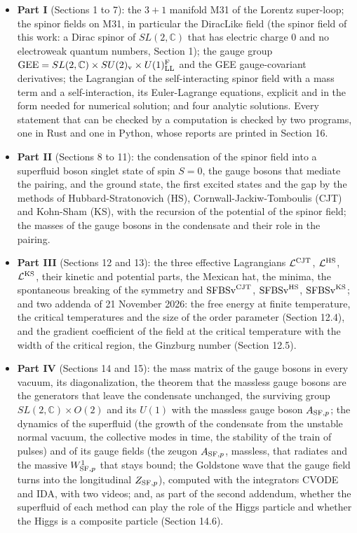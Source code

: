 \documentclass[
  10pt,
]{article}
\providecommand{\tightlist}{%
  \setlength{\itemsep}{0pt}\setlength{\parskip}{0pt}}
\begin{document}
\begin{itemize}
\tightlist
\item
  \textbf{Part I} (Sections 1 to 7): the \(3+1\) manifold M31 of the
  Lorentz super-loop; the spinor fields on M31, in particular the
  DiracLike field (the spinor field of this work: a Dirac spinor of
  \(SL(2,\mathbb C)\) that has electric charge 0 and no electroweak
  quantum numbers, Section 1); the gauge group
  \(\mathrm{GEE}=SL(2,\mathbb C)\times SU(2)_{\rm v}\times U(1)^{\rm F}_{\rm LL}\)
  and the GEE gauge-covariant derivatives; the Lagrangian of the
  self-interacting spinor field with a mass term and a self-interaction,
  its Euler-Lagrange equations, explicit and in the form needed for
  numerical solution; and four analytic solutions. Every statement that
  can be checked by a computation is checked by two programs, one in
  Rust and one in Python, whose reports are printed in Section 16.
\item
  \textbf{Part II} (Sections 8 to 11): the condensation of the spinor
  field into a superfluid boson singlet state of spin \(S=0\), the gauge
  bosons that mediate the pairing, and the ground state, the first
  excited states and the gap by the methods of Hubbard-Stratonovich
  (HS), Cornwall-Jackiw-Tomboulis (CJT) and Kohn-Sham (KS), with the
  recursion of the potential of the spinor field; the masses of the
  gauge bosons in the condensate and their role in the pairing.
\item
  \textbf{Part III} (Sections 12 and 13): the three effective
  Lagrangians \(\mathcal L^{\rm CJT}\), \(\mathcal L^{\rm HS}\),
  \(\mathcal L^{\rm KS}\), their kinetic and potential parts, the
  Mexican hat, the minima, the spontaneous breaking of the symmetry and
  \(\mathrm{SFBSv}^{\rm CJT}\), \(\mathrm{SFBSv}^{\rm HS}\),
  \(\mathrm{SFBSv}^{\rm KS}\); and two addenda of 21 November 2026: the
  free energy at finite temperature, the critical temperatures and the
  size of the order parameter (Section 12.4), and the gradient
  coefficient of the field at the critical temperature with the width of
  the critical region, the Ginzburg number (Section 12.5).
\item
  \textbf{Part IV} (Sections 14 and 15): the mass matrix of the gauge
  bosons in every vacuum, its diagonalization, the theorem that the
  massless gauge bosons are the generators that leave the condensate
  unchanged, the surviving group \(SL(2,\mathbb C)\times O(2)\) and its
  \(U(1)\) with the massless gauge boson \(A_{{\rm SF},p}\); the
  dynamics of the superfluid (the growth of the condensate from the
  unstable normal vacuum, the collective modes in time, the stability of
  the train of pulses) and of its gauge fields (the zeugon
  \(A_{{\rm SF},p}\), massless, that radiates and the massive
  \(W^1_{{\rm SF},p}\) that stays bound; the Goldstone wave that the
  gauge field turns into the longitudinal \(Z_{{\rm SF},p}\)), computed
  with the integrators CVODE and IDA, with two videos; and, as part of
  the second addendum, whether the superfluid of each method can play
  the role of the Higgs particle and whether the Higgs is a composite
  particle (Section 14.6).
\end{itemize}
\end{document}
